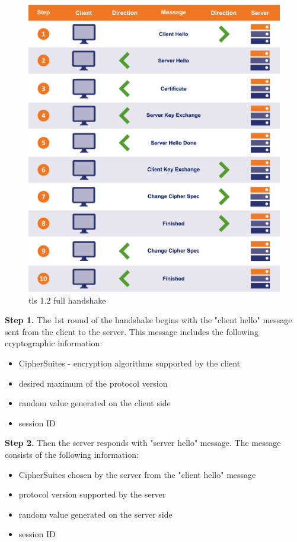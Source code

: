 \begin{figure}[H]
	\centering
		\includegraphics[scale=0.35]{images/handshake1_2.png}
	\caption{\gls{tls} 1.2 full handshake \cite{sslstore:handshake}}
	\label{fig:handshake1_2}
\end{figure}

\textbf{Step 1.} The 1st round of the handshake begins with the "client hello" message sent from the client to the server. This message includes the following cryptographic information:

\begin{itemize}
	\item CipherSuites - encryption algorithms supported by the client
	\item desired maximum of the protocol version
	\item random value generated on the client side
	\item session ID
\end{itemize}

\textbf{Step 2.} Then the server responds with "server hello" message. The message consists of the following information:

\begin{itemize}
	\item CipherSuites chosen by the server from the "client hello" message
	\item protocol version supported by the server
	\item random value generated on the server side
	\item session ID
\end{itemize}

